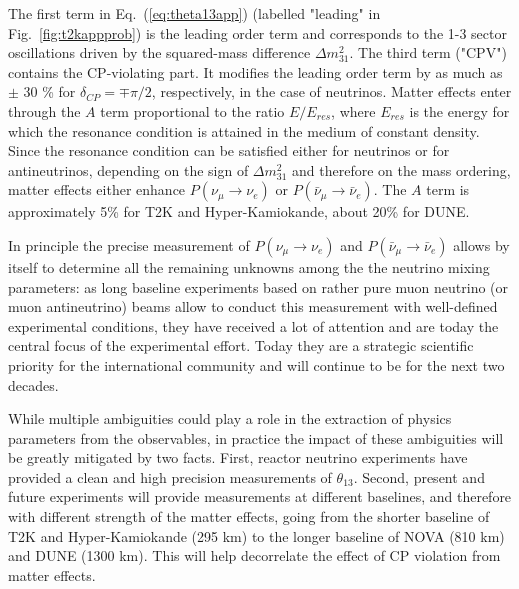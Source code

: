 The first term in Eq.~(\ref{eq:theta13app}) (labelled "leading" in Fig.~\ref{fig:t2kappprob}) is the leading order term and corresponds to the 1-3 sector oscillations driven by the squared-mass difference $\Delta m^2_{31}$. %
%
%
The third term ("CPV") contains the CP-violating part. %
It modifies the leading order term by as much as $\pm$ 30 \% for $\delta_{CP} = \mp \pi/2$, respectively, in the case of neutrinos.
%
%
Matter effects enter through the $A$ term proportional to the ratio $E/E_{res}$, where $E_{res}$ is the energy for which the resonance condition is attained in the medium of constant density. Since the resonance condition can be satisfied either for neutrinos or for antineutrinos, depending on the sign of $\Delta m^2_{31}$ and therefore on the mass ordering, matter effects either enhance $ P (\nu_\mu \rightarrow \nu_e)$ or  $ P (\bar{\nu}_\mu \rightarrow \bar{\nu}_e)$.
The $A$ term is approximately 5\% for T2K and Hyper-Kamiokande, about 20\% for DUNE.

In principle the precise measurement of $P(\nu_{\mu} \rightarrow \nu_e)$ and $P(\bar{\nu}_{\mu} \rightarrow \bar{\nu}_e)$ allows by itself to determine all the remaining unknowns among the the neutrino mixing parameters: as long baseline experiments based on rather pure muon neutrino (or muon antineutrino) beams allow to conduct this measurement with  well-defined experimental conditions, they have received a lot of attention and are today the central focus of the experimental effort. Today they are a strategic scientific priority for the international community and will continue to be for the next two decades.

While multiple ambiguities could play a role in the extraction of physics parameters from the observables, in practice the impact of these ambiguities will be greatly mitigated by two facts. First, reactor neutrino experiments have provided a clean and high precision measurements of $\theta_{13}$. Second, present and future experiments will provide measurements at different baselines, and therefore with different strength of the matter effects, going from the shorter baseline of T2K and Hyper-Kamiokande (295 km) to the longer baseline of NOVA (810 km) and DUNE (1300 km). This will help decorrelate the effect of CP violation from matter effects.


